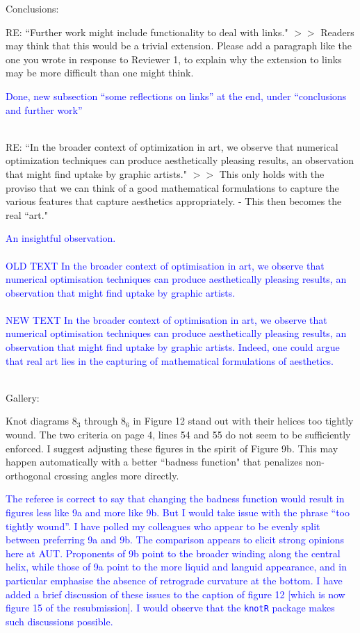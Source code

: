 \documentclass[12pt]{article}
\begin{document}
Conclusions:

RE: ``Further work might include functionality to deal
with links."  $>>$ Readers may think that this would be a trivial
extension.  Please add a paragraph like the one you wrote in response
to Reviewer 1, to explain why the extension to links may be more
difficult than one might think.

\textcolor{blue}{Done, new subsection ``some reflections on links''
  at the end, under ``conclusions and further work''\\ \\}

RE: ``In the broader context of optimization in art, we observe that
numerical optimization techniques can produce aesthetically pleasing
results, an observation that might find uptake by graphic artists."
$>>$ This only holds with the proviso that we can think of a good
mathematical formulations to capture the various features that capture
aesthetics appropriately.  - This then becomes the real ``art."

\textcolor{blue}{ An insightful observation.\\ \\ OLD TEXT In the
  broader context of optimisation in art, we observe that numerical
  optimisation techniques can produce aesthetically pleasing results,
  an observation that might find uptake by graphic artists.\\ \\ NEW
  TEXT In the broader context of optimisation in art, we observe that
  numerical optimisation techniques can produce aesthetically pleasing
  results, an observation that might find uptake by graphic artists.
  Indeed, one could argue that real art lies in the capturing of
  mathematical formulations of aesthetics.  \\ \\ }


Gallery:

Knot diagrams $8_3$ through $8_6$ in Figure 12 stand out with their helices
too tightly wound.  The two criteria on page 4, lines 54 and 55 do not
seem to be sufficiently enforced.  I suggest adjusting these figures
in the spirit of Figure 9b.  This may happen automatically with a
better ``badness function" that penalizes non-orthogonal crossing
angles more directly.

\textcolor{blue}{The referee is correct to say that changing the
  badness function would result in figures less like 9a and more like
  9b.  But I would take issue with the phrase ``too tightly wound''.
  I have polled my colleagues who appear to be evenly split between
  preferring 9a and 9b.  The comparison appears to elicit strong
  opinions here at AUT.  Proponents of 9b point to the broader winding
  along the central helix, while those of 9a point to the more liquid
  and languid appearance, and in particular emphasise the absence of
  retrograde curvature at the bottom.  I have added a brief discussion
  of these issues to the caption of figure 12 [which is now figure 15
    of the resubmission].  I would observe that the {\tt knotR}
  package makes such discussions possible.\\ \\}
\end{document}
